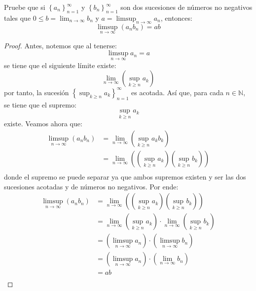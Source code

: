 \documentclass[12pt]{report}
\newcounter{it}
\theoremstyle{largebreak}
\begin{document}
    \begin{excer}
        \label{productoSucesionesLimSupLim}
        Pruebe que si $\left\{a_n\right\}_{ n=1}^\infty$ y $\left\{b_n\right\}_{ n=1}^\infty$ son dos sucesiones de números no negativos tales que $0\leq b=\lim_{ n\rightarrow\infty}b_n$ y $a=\limsup_{ n\rightarrow\infty}a_n$, entonces:
        \begin{equation*}
            \limsup_{ n\rightarrow\infty}(a_nb_n)=ab
        \end{equation*}
    \end{excer}

    \begin{proof}
        Antes, notemos que al tenerse:
        \begin{equation*}
            \limsup_{ n\rightarrow\infty}a_n=a
        \end{equation*}
        se tiene que el siguiente límite existe:
        \begin{equation*}
            \lim_{ n\rightarrow\infty}\left(\sup_{ k\geq n}a_k \right)
        \end{equation*}
        por tanto, la sucesión $\left\{\sup_{ k\geq n}a_k\right\}_{ n=1}^\infty$ es acotada. Así que, para cada $n\in\mathbb{N}$, se tiene que el supremo:
        \begin{equation*}
            \sup_{ k\geq n}a_k
        \end{equation*}
        existe. Veamos ahora que:
        \begin{equation*}
            \begin{split}
                \limsup_{ n\rightarrow\infty}(a_nb_n)&=\lim_{ n\rightarrow\infty}\left(\sup_{ k\geq n}a_kb_k \right)\\
                &=\lim_{ n\rightarrow\infty}\left(\left(\sup_{ k\geq n}a_k\right)\left(\sup_{ k\geq n}b_k\right) \right)\\
            \end{split}
        \end{equation*}
        donde el supremo se puede separar ya que ambos supremos existen y ser las dos sucesiones acotadas y de números no negativos. Por ende:
        \begin{equation*}
            \begin{split}
                \limsup_{ n\rightarrow\infty}(a_nb_n)&=\lim_{ n\rightarrow\infty}\left(\left(\sup_{ k\geq n}a_k\right)\left(\sup_{ k\geq n}b_k\right) \right)\\
                &=\lim_{ n\rightarrow\infty}\left(\sup_{ k\geq n} a_k\right)\cdot\lim_{ n\rightarrow\infty}\left(\sup_{ k\geq n}b_k\right)\\
                &=\left(\limsup_{ n\rightarrow\infty}a_n\right)\cdot\left(\limsup_{ n\rightarrow\infty}b_n\right)\\
                &=\left(\limsup_{ n\rightarrow\infty}a_n\right)\cdot\left(\lim_{ n\rightarrow\infty}b_n\right)\\
                &=ab\\
            \end{split}
        \end{equation*}

    \end{proof}
\end{document}
